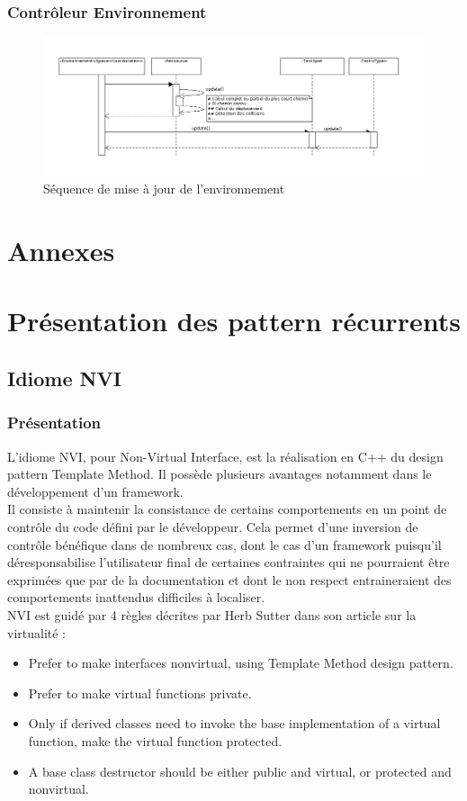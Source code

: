 \subsubsection{Contrôleur Environnement}

\begin{figure}[!p]\centering
   \includegraphics[angle=90, scale=0.55]{images/seq_environnement.png}
   \caption{\label{seq_env} Séquence de mise à jour de l'environnement}
\end{figure}

\newpage
\section{Annexes}

\section{Présentation des pattern récurrents}
\subsection{Idiome NVI}
\subsubsection{Présentation}
L'idiome NVI, pour Non-Virtual Interface, est la réalisation en C++ du design pattern Template Method. Il possède plusieurs avantages notamment dans le développement d'un framework.\\
Il consiste à maintenir la consistance de certains comportements en un point de contrôle du code défini par le développeur. Cela permet d'une inversion de contrôle bénéfique dans de nombreux cas, dont le cas d'un framework puisqu'il déresponsabilise l'utilisateur final de certaines contraintes qui ne pourraient être exprimées que par de la documentation et dont le non respect entraineraient des comportements inattendus difficiles à localiser.\\
NVI est guidé par 4 règles décrites par Herb Sutter dans son article sur la virtualité :
\begin{itemize}
\item Prefer to make interfaces nonvirtual, using Template Method design pattern.
\item Prefer to make virtual functions private.
\item Only if derived classes need to invoke the base implementation of a virtual function, make the virtual function protected.
\item A base class destructor should be either public and virtual, or protected and nonvirtual.
\end{itemize}

